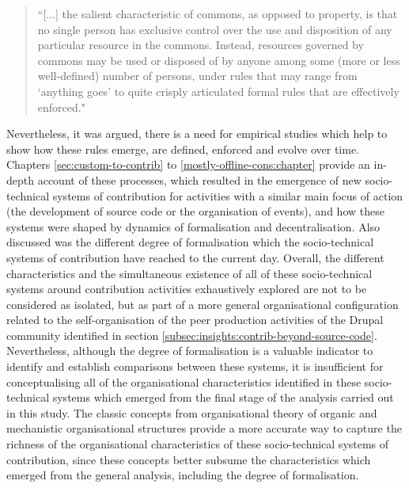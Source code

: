 \begin{quotation}
``[...] the salient characteristic of commons, as opposed to property, is that no single person has exclusive control over the use and disposition of any particular resource in the commons. Instead, resources governed by commons may be used or disposed of by anyone among some (more or less well-defined) number of persons, under rules that may range from `anything goes' to quite crisply articulated formal rules that are effectively enforced."
\end{quotation}

Nevertheless, it was argued, there is a need for empirical studies which help to show how these rules emerge, are defined, enforced and evolve over time. Chapters \ref{sec:custom-to-contrib} to \ref{mostly-offline-cons:chapter} provide an in-depth account of these processes, which resulted in the emergence of new socio-technical systems of contribution for activities with a similar main focus of action (the development of source code or the organisation of events), and how these systems were shaped by dynamics of formalisation and decentralisation. Also discussed was the different degree of formalisation which the socio-technical systems of contribution have reached to the current day. Overall, the different characteristics and the simultaneous existence of all of these socio-technical systems around contribution activities exhaustively explored are not to be considered as isolated, but as part of a more general organisational configuration related to the self-organisation of the peer production activities of the Drupal community identified in section \ref{subsec:insights:contrib-beyond-source-code}. Nevertheless, although the degree of formalisation is a valuable indicator to identify and establish comparisons between these systems, it is insufficient for conceptualising all of the organisational characteristics identified in these socio-technical systems which emerged from the final stage of the analysis carried out in this study. The classic concepts from organisational theory of organic and mechanistic organisational structures \parencite{burns1961management} provide a more accurate way to capture the richness of the organisational characteristics of these socio-technical systems of contribution, since these concepts better subsume the characteristics which emerged from the general analysis, including the degree of formalisation.

